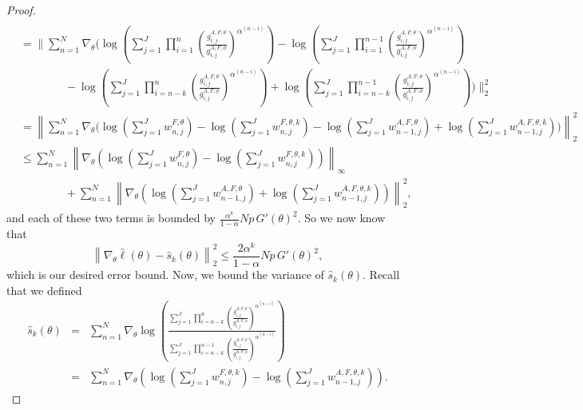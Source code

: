 \begin{proof}
\begin{align}
    \\ \nonumber
    &= \Bigg\lVert\sum_{n=1}^N \nabla_\theta \Bigg(\log\left(\sum_{j=1}^J\prod_{i=1}^n\left(\frac{g_{i,j}^{A,F,\theta}}{g_{i,j}^{A,F,\phi}} \right)^{\alpha^{(n-i)}}\right)- \log\left(\sum_{j=1}^J\prod_{i=1}^{n-1}\left(\frac{g_{i,j}^{A,F,\theta}}{g_{i,j}^{A,F,\phi}} \right)^{\alpha^{(n-i)}}\right)
    \\
    &\qquad\qquad -\log\left(\sum_{j=1}^J\prod_{i=n-k}^n\left(\frac{g_{i,j}^{A,F,\theta}}{g_{i,j}^{A,F,\phi}} \right)^{\alpha^{(n-i)}}\right) + \log\left(\sum_{j=1}^J\prod_{i=n-k}^{n-1}\left(\frac{g_{i,j}^{A,F,\theta}}{g_{i,j}^{A,F,\phi}} \right)^{\alpha^{(n-i)}}\right)\Bigg)\Bigg\rVert_2^2 
    \\ 
    &= \left\lVert\sum_{n=1}^N \nabla_\theta \Bigg(\!\log\!\left(\sum_{j=1}^Jw_{n,j}^{F,\theta}\right) \!-\! \log\!\left(\sum_{j=1}^Jw_{n,j}^{F,\theta,k}\right)
    \!-\! \log\!\left(\sum_{j=1}^Jw_{n-1,j}^{A, F,\theta}\right) \!+\! \log \! \left(\sum_{j=1}^Jw_{n-1,j}^{A, F,\theta,k}\right)\!\Bigg)\right\rVert_2^2 
    \\ \nonumber
    &\leq \sum_{n=1}^N \left\lVert\nabla_\theta \left(\log\left(\sum_{j=1}^Jw_{n,j}^{F,\theta}\right)- \log\left(\sum_{j=1}^Jw_{n,j}^{F,\theta,k}\right)\right)\right\lVert_{\infty}
    \\ 
    & \qquad\qquad +\sum_{n=1}^N \left\lVert\nabla_\theta \left(\log\left(\sum_{j=1}^Jw_{n-1,j}^{A, F,\theta}\right) + \log\left(\sum_{j=1}^Jw_{n-1,j}^{A, F,\theta,k}\right)\right)\right\rVert_2^2,
\end{align}
and each of these two terms is bounded by $\frac{\alpha^k}{1-\alpha}Np \, G'(\theta)^2$. So we now know that
\begin{equation}\left\lVert\nabla_\theta\hat\ell(\theta) - \hat s_k(\theta) \right\rVert_2^2 \leq  \frac{2\alpha^k}{1-\alpha}Np \, G'(\theta)^2,\end{equation}
which is our desired error bound. 
Now, we bound the variance of $\hat s_k(\theta)$. 
Recall that we defined
\begin{eqnarray}
\hat s_k(\theta) &=& \sum_{n=1}^N \nabla_\theta\log\left(\frac{\sum_{j=1}^J\prod_{i=n-k}^n\left(\frac{g_{i,j}^{A,F,\theta}}{g_{i,j}^{A,F,\phi}} \right)^{\alpha^{(n-i)}}}{\sum_{j=1}^J\prod_{i=n-k}^{n-1}\left(\frac{g_{i,j}^{A,F,\theta}}{g_{i,j}^{A,F,\phi}} \right)^{\alpha^{(n-i)}}}\right) 
\\
&=& \sum_{n=1}^N \nabla_\theta \left(\log\left(\sum_{j=1}^J w_{n,j}^{F,\theta, k}\right)-\log\left(\sum_{j=1}^J w_{n-1,j}^{A, F,\theta, k}\right)\right).
\end{eqnarray}

\end{proof}
